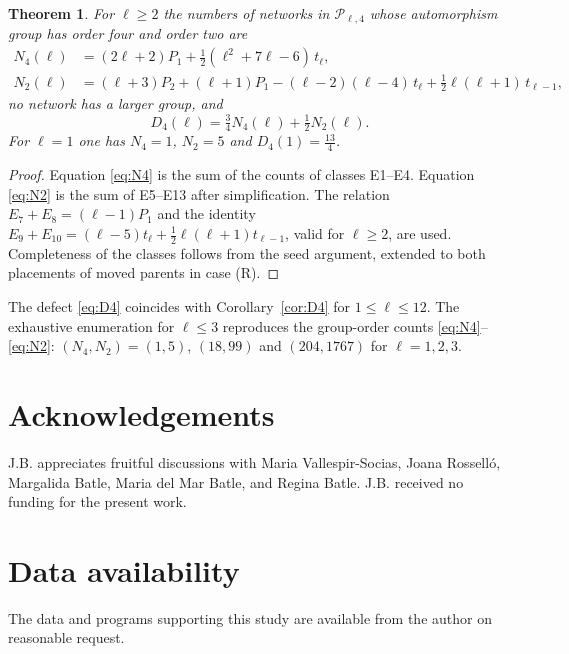 \documentclass[11pt,a4paper]{article}
\newtheorem{theorem}{Theorem}[section]
\theoremstyle{definition}
\newcommand{\cP}{\mathcal{P}}
\begin{document}
\begin{theorem}\label{thm:D4}
For $\ell\ge2$ the numbers of networks in $\cP_{\ell,4}$ whose automorphism group has order four and order two are
\begin{align}
N_4(\ell)&=(2\ell+2)P_1+\tfrac12(\ell^2+7\ell-6)\,t_\ell,\label{eq:N4}\\
N_2(\ell)&=(\ell+3)P_2+(\ell+1)P_1-(\ell-2)(\ell-4)\,t_\ell+\tfrac12\ell(\ell+1)\,t_{\ell-1},\label{eq:N2}
\end{align}
no network has a larger group, and
\begin{equation}\label{eq:D4}
D_4(\ell)=\tfrac34N_4(\ell)+\tfrac12N_2(\ell).
\end{equation}
For $\ell=1$ one has $N_4=1$, $N_2=5$ and $D_4(1)=\tfrac{13}{4}$.
\end{theorem}

\begin{proof}
Equation \eqref{eq:N4} is the sum of the counts of classes E1--E4. Equation \eqref{eq:N2} is the sum of E5--E13 after simplification. The relation $E_7+E_8=(\ell-1)P_1$ and the identity $E_9+E_{10}=(\ell-5)t_\ell+\tfrac12\ell(\ell+1)t_{\ell-1}$, valid for $\ell\ge2$, are used. Completeness of the classes follows from the seed argument, extended to both placements of moved parents in case (R).
\end{proof}

The defect \eqref{eq:D4} coincides with Corollary~\ref{cor:D4} for $1\le\ell\le12$. The exhaustive enumeration for $\ell\le3$ reproduces the group-order counts \eqref{eq:N4}--\eqref{eq:N2}: $(N_4,N_2)=(1,5)$, $(18,99)$ and $(204,1767)$ for $\ell=1,2,3$.


\section*{Acknowledgements}
J.B. appreciates fruitful discussions with Maria Vallespir-Socias, Joana Rossell\'o, Margalida Batle, Maria del Mar Batle, and Regina Batle. J.B. received no funding for the present work.

\section*{Data availability}
The data and programs supporting this study are available from the author on reasonable request.
\end{document}
